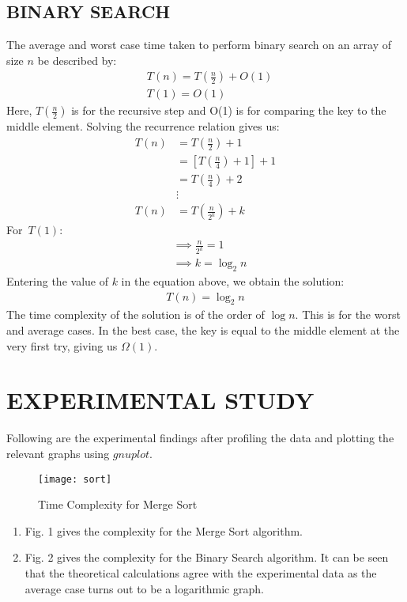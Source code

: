 \documentclass[letterpaper, 11 pt, conference]{ieeeconf}  %
\begin{document}
\subsection{BINARY SEARCH}
The average and worst case time taken to perform binary search on an array of size $n$ be described by:
\begin{align*}
&T(n) = T(\frac{n}{2}) + O(1) \\
&T(1) = O(1)
\end{align*}
Here, $T(\frac{n}{2})$ is for the recursive step and O(1) is for comparing the key to the middle element. Solving the recurrence relation gives us:
\begin{align*}
T(n) &= T(\frac{n}{2}) + 1 \\
&= [T(\frac{n}{4}) + 1] + 1 \\
&= T(\frac{n}{4}) + 2 \\
&\vdots \\
T(n) &= T(\frac{n}{2^k}) + k
\end{align*}
For\ $T(1)$:
\begin{align*}
&\implies \frac{n}{2^k} = 1 \\
&\implies k = \log_2 n
\end{align*}
Entering the value of $k$ in the equation above, we obtain the solution:
\begin{align*}
T(n) = \log_2 n
\end{align*}
The time complexity of the solution is of the order of $\log n$. This is for the worst and average cases. In the best case, the key is equal to the middle element at the very first try, giving us $\Omega(1)$.

\section{EXPERIMENTAL STUDY} 
Following are the experimental findings after profiling the data and plotting the relevant graphs using $gnuplot$.

\begin{figure}
\texttt{[image: sort]}
\caption{Time Complexity for Merge Sort}
\end{figure}

\begin{enumerate}
\item Fig. 1 gives the complexity for the Merge Sort algorithm.
\item Fig. 2 gives the complexity for the Binary Search algorithm. It can be seen that the theoretical calculations agree with the experimental data as the average case turns out to be a logarithmic graph.
\end{enumerate}
\end{document}
